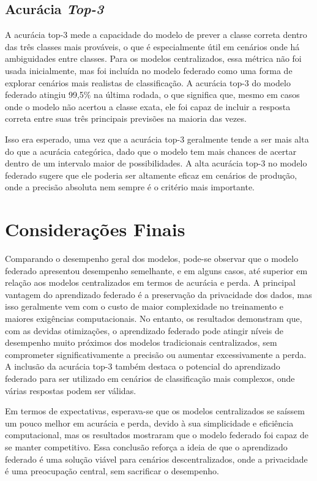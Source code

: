 \subsection{Acurácia \textit{Top-3}}

A acurácia top-3 mede a capacidade do modelo de prever a classe correta dentro das três classes mais prováveis, o que é especialmente útil em cenários onde há ambiguidades entre classes. Para os modelos centralizados, essa métrica não foi usada inicialmente, mas foi incluída no modelo federado como uma forma de explorar cenários mais realistas de classificação. A acurácia top-3 do modelo federado atingiu 99,5\% na última rodada, o que significa que, mesmo em casos onde o modelo não acertou a classe exata, ele foi capaz de incluir a resposta correta entre suas três principais previsões na maioria das vezes.

Isso era esperado, uma vez que a acurácia top-3 geralmente tende a ser mais alta do que a acurácia categórica, dado que o modelo tem mais chances de acertar dentro de um intervalo maior de possibilidades.  A alta acurácia top-3 no modelo federado sugere que ele poderia ser altamente eficaz em cenários de produção, onde a precisão absoluta nem sempre é o critério mais importante.

\section{Considerações Finais}

Comparando o desempenho geral dos modelos, pode-se observar que o modelo federado apresentou desempenho semelhante, e em alguns casos, até superior em relação aos modelos centralizados em termos de acurácia e perda. A principal vantagem do aprendizado federado é a preservação da privacidade dos dados, mas isso geralmente vem com o custo de maior complexidade no treinamento e maiores exigências computacionais. No entanto, os resultados demonstram que, com as devidas otimizações, o aprendizado federado pode atingir níveis de desempenho muito próximos dos modelos tradicionais centralizados, sem comprometer significativamente a precisão ou aumentar excessivamente a perda. A inclusão da acurácia top-3 também destaca o potencial do aprendizado federado para ser utilizado em cenários de classificação mais complexos, onde várias respostas podem ser válidas.

Em termos de expectativas, esperava-se que os modelos centralizados se saíssem um pouco melhor em acurácia e perda, devido à sua simplicidade e eficiência computacional, mas os resultados mostraram que o modelo federado foi capaz de se manter competitivo. Essa conclusão reforça a ideia de que o aprendizado federado é uma solução viável para cenários descentralizados, onde a privacidade é uma preocupação central, sem sacrificar o desempenho.

